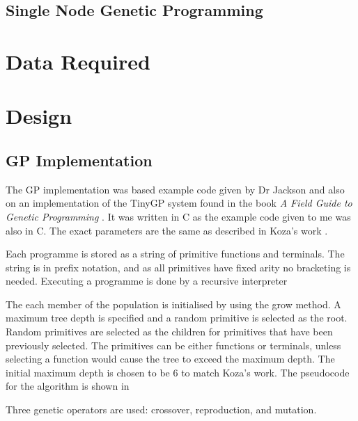 \documentclass{article}
\begin{document}
		\subsection{Single Node Genetic Programming}
		 
		
	
	\section{Data Required}
	
	\section{Design}
	
		\subsection{GP Implementation}
		
		The GP implementation was based example code given by Dr Jackson and also on an implementation of the TinyGP system found in the book \textit{A Field Guide to Genetic
		Programming} \cite{poli_field_2008}. It was written in C as the example code given to me was also in C. The exact parameters are the same as described in Koza's work \cite{kinnear_generality_1993}.
		
		Each programme is stored as a string of primitive functions and terminals. The string is in prefix notation, and as all primitives have fixed arity no bracketing is needed. Executing a programme is done by a recursive interpreter 
		
		The each member of the population is initialised by using the grow method. A maximum tree depth is specified and a random primitive is selected as the root. Random primitives are selected as the children for primitives that have been previously selected. The primitives can be either functions or terminals, unless selecting a function would cause the tree to exceed the maximum depth. The initial maximum depth is chosen to be 6 to match Koza's work. The pseudocode for the algorithm is shown in
		
		\begin{algorithm}
		\end{algorithm}
	
		Three genetic operators are used: crossover, reproduction, and mutation. 
		
\end{document}
